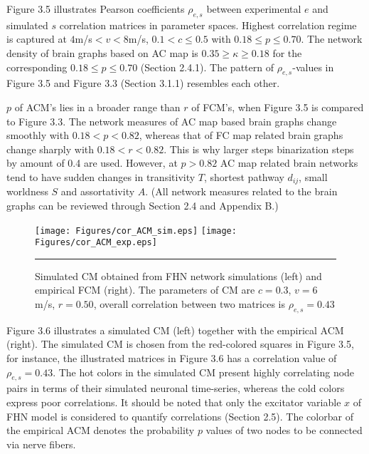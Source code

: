 Figure 3.5 illustrates Pearson coefficients $\rho_{e,s}$ between experimental $e$ and simulated $s$ correlation matrices in parameter spaces. Highest correlation regime is captured at $4$m/s$<v<8$m/s, $0.1 < c \leq 0.5$ with $0.18 \leq p \leq 0.70 $. The network density of brain graphs based on AC map is $0.35 \geq   \kappa \geq 0.18$ for the corresponding $0.18 \leq p \leq 0.70 $ (Section 2.4.1). The pattern of $\rho_{e,s}$-values in Figure 3.5 and Figure 3.3 (Section 3.1.1) resembles each other. 

$p$ of ACM's lies in a broader range than $r$ of FCM's, when Figure 3.5 is compared to Figure 3.3. The network measures of AC map based brain graphs change smoothly with $0.18<p<0.82$, whereas that of FC map related brain graphs change sharply with $0.18<r<0.82$. This is why larger steps binarization steps by amount of 0.4 are used. However, at $p>0.82$ AC map related brain networks tend to have sudden changes in transitivity $T$, shortest pathway $d_{ij}$, small worldness $S$  and assortativity $A$. (All network measures related to the brain graphs can be reviewed through Section 2.4 and Appendix B.)

\begin{figure}[htbp]
 
  \centering
	 \texttt{[image: Figures/cor\_ACM\_sim.eps]} 
   	 \texttt{[image: Figures/cor\_ACM\_exp.eps]} 

    \rule{35em}{0.5pt}
  \caption[High correlated FHN simulation, ACM]{ Simulated CM obtained from FHN network simulations (left) and empirical FCM (right). The parameters of CM are $c=0.3$, $v=6$ m/s, $r=0.50$, overall correlation between two matrices is $\rho_{e,s} = 0.43$ }
    \label{fig:High correlated FHN simulation, ACM}
 	
\end{figure}

Figure 3.6 illustrates a simulated CM (left) together with the empirical ACM (right). The simulated CM is chosen from the red-colored squares in Figure 3.5, for instance, the illustrated matrices in Figure 3.6 has a correlation value of $\rho_{e,s}=0.43$. The hot colors in the simulated CM present highly correlating node pairs in terms of their simulated neuronal time-series, whereas the cold colors express poor correlations. It should be noted that only the excitator variable $x$ of FHN model is considered to quantify correlations (Section 2.5). The colorbar of the empirical ACM denotes the probability $p$ values of two nodes to be connected via nerve fibers.
 
